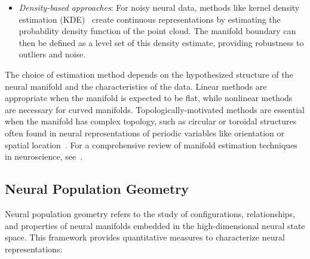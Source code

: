 \documentclass[11pt,a4paper]{article}
\begin{document}
\begin{enumerate}
\begin{itemize}
        \item \textit{Density-based approaches}: For noisy neural data, methods like kernel density estimation (KDE)~\cite{wasserman2006all} create continuous representations by estimating the probability density function of the point cloud. The manifold boundary can then be defined as a level set of this density estimate, providing robustness to outliers and noise.
    \end{itemize}
    
    The choice of estimation method depends on the hypothesized structure of the neural manifold and the characteristics of the data. Linear methods are appropriate when the manifold is expected to be flat, while nonlinear methods are necessary for curved manifolds. Topologically-motivated methods are essential when the manifold has complex topology, such as circular or toroidal structures often found in neural representations of periodic variables like orientation or spatial location~\cite{chaudhuri2019intrinsic, gardner2022toroidal}. For a comprehensive review of manifold estimation techniques in neuroscience, see~\cite{cunningham2014dimensionality, gallego2017neural}.
\end{enumerate}

\subsection{Neural Population Geometry}

Neural population geometry refers to the study of configurations, relationships, and properties of neural manifolds embedded in the high-dimensional neural state space. This framework provides quantitative measures to characterize neural representations:
\end{document}
